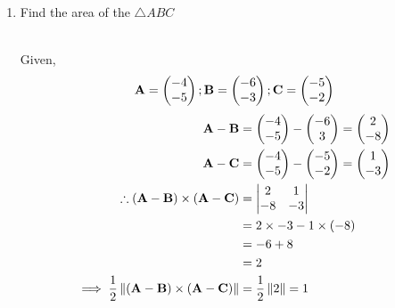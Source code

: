 \documentclass[11pt]{book}
\begin{document}
\begin{enumerate}[label=\thesection.\arabic*.,ref=\thesection.\theenumi]
\item Find the area of the $\triangle ABC$

	\solution\\
Given,
\begin{align}
 \mathbf{A} = \begin{pmatrix}-4\\-5\end{pmatrix};
 \mathbf{B} = \begin{pmatrix}-6\\-3\end{pmatrix};
 \mathbf{C} = \begin{pmatrix}-5\\-2\end{pmatrix}
 \end{align}
 \begin{align}
 \mathbf{A}-\mathbf{B} &= \begin{pmatrix}-4\\-5\end{pmatrix} - \begin{pmatrix}-6\\3\end{pmatrix} = \begin{pmatrix}2\\-8\end{pmatrix}\\
 \mathbf{A}-\mathbf{C} &= \begin{pmatrix}-4\\-5\end{pmatrix} - \begin{pmatrix}-5\\-2\end{pmatrix} = \begin{pmatrix}1\\-3\end{pmatrix}\\
\therefore(\mathbf{A}-\mathbf{B})\times(\mathbf{A}-\mathbf{C}) 
 &= \begin{vmatrix}2 & 1\\ -8 & -3\end{vmatrix}\\
 &= 2 \times -3 - 1 \times (-8)\\ &= -6 + 8\\ &= 2\\
 \implies\frac{1}{2}\left\lVert(\mathbf{A}-\mathbf{B})\times(\mathbf{A}-\mathbf{C})\right\rVert &= \frac{1}{2}\left\lVert2\right\rVert= 1
\end{align}


\end{enumerate}
\end{document}
